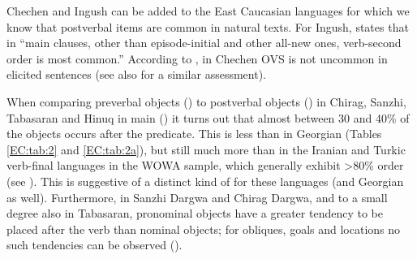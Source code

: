 \documentclass[output=paper,colorlinks,citecolor=brown,draftmode]{langscibook}
\begin{document}
Chechen and Ingush can be added to the East Caucasian languages for which we know that postverbal items are common in natural texts. For Ingush, \citet[678]{nichols_ingush_2011} states that in ``main clauses, other than episode-initial and other all-new ones, verb-second order is most common.'' According to \citet{nichols_chechen_1994}, in Chechen OVS is not uncommon in elicited sentences (see also \citealt[32]{komen_focus_2007} for a similar assessment).

When comparing preverbal objects () to postverbal objects () in Chirag, Sanzhi, Tabasaran and Hinuq in main () it turns out that almost between 30 and 40\% of the objects occurs after the predicate. This is less than in Georgian (Tables \ref{EC:tab:2} and \ref{EC:tab:2a}), but still much more than in the Iranian and Turkic verb-final languages in the WOWA sample, which generally exhibit >80\%  order (see ). This is suggestive of a distinct kind of  for these languages (and Georgian as well). Furthermore, in Sanzhi Dargwa and Chirag Dargwa, and to a small degree also in Tabasaran, pronominal objects have a greater tendency to be placed after the verb than nominal objects; for obliques, goals and locations no such tendencies can be observed ().
\end{document}
